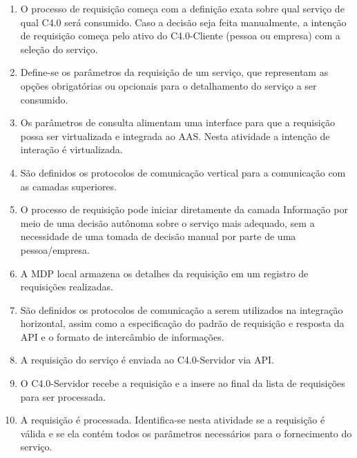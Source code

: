 	\begin{enumerate}
		
		\item O processo de requisição começa com a definição exata sobre qual serviço de qual C4.0 será consumido. Caso a decisão seja feita manualmente, a intenção de requisição começa pelo ativo do C4.0-Cliente (pessoa ou empresa) com a seleção do serviço.
		
		\item Define-se os parâmetros da requisição de um serviço, que representam as opções obrigatórias ou opcionais para o detalhamento do serviço a ser consumido.
		
		\item Os parâmetros de consulta alimentam uma interface para que a requisição possa ser virtualizada e integrada ao AAS. Nesta atividade a intenção de interação é virtualizada.
		
		\item São definidos os protocolos de comunicação vertical para a comunicação com as camadas superiores.
		
		\item O processo de requisição pode iniciar diretamente da camada Informação por meio de uma decisão autônoma sobre o serviço mais adequado, sem a necessidade de uma tomada de decisão manual por parte de uma pessoa/empresa.
		
		\item A MDP local armazena os detalhes da requisição em um registro de requisições realizadas.
		
		\item São definidos os protocolos de comunicação a serem utilizados na integração horizontal, assim como a especificação do padrão de requisição e resposta da API e o formato de intercâmbio de informações.
		
		\item A requisição do serviço é enviada ao C4.0-Servidor via API.
		
		\item O C4.0-Servidor recebe a requisição e a insere ao final da lista de requisições para ser processada.
		
		\item A requisição é processada. Identifica-se nesta atividade se a requisição é válida e se ela contém todos os parâmetros necessários para o fornecimento do serviço.
		
	
	\end{enumerate}


